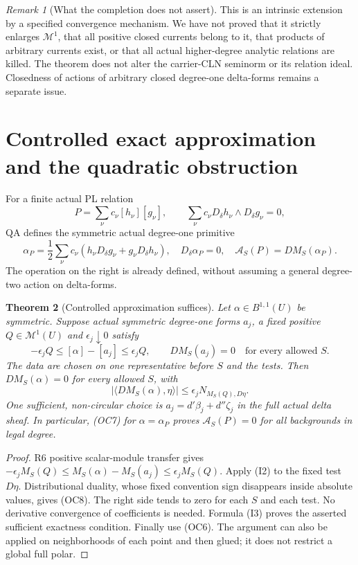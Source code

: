 \documentclass[11pt]{article}
\newtheorem{theorem}{Theorem}
\theoremstyle{remark}\newtheorem{remark}[theorem]{Remark}
\newcommand{\M}{\mathcal M^1}
\begin{document}
\begin{remark}[What the completion does not assert]
This is an intrinsic extension by a specified convergence mechanism.
We have not proved that it strictly enlarges $\M$, that all positive closed
currents belong to it, that products of arbitrary currents exist, or that
all actual higher-degree analytic relations are killed. The theorem does
not alter the carrier-CLN seminorm or its relation ideal. Closedness of
actions of arbitrary closed degree-one delta-forms remains a separate issue.
\end{remark}

\section{Controlled exact approximation and the quadratic obstruction}

For a finite actual PL relation
\[
 P=\sum_\nu c_\nu[h_\nu][g_\nu],\qquad
 \sum_\nu c_\nu D_\delta h_\nu\wedge D_\delta g_\nu=0,
\]
QA defines the symmetric actual degree-one primitive
\[
 \alpha_P=\frac12\sum_\nu c_\nu
       (h_\nu D_\delta g_\nu+g_\nu D_\delta h_\nu),
 \quad D_\delta\alpha_P=0,
 \quad\mathcal A_S(P)=DM_S(\alpha_P).                    \tag{OC6}
\]
The operation on the right is already defined, without assuming a
general degree-two action on delta-forms.

\begin{theorem}[Controlled approximation suffices]\label{thm:density}
Let $\alpha\in B^{1,1}(U)$ be symmetric. Suppose actual symmetric
degree-one forms $a_j$, a fixed positive $Q\in\M(U)$ and
$\epsilon_j\downarrow0$ satisfy
\[
 -\epsilon_jQ\le[\alpha]-[a_j]\le\epsilon_jQ,
 \qquad DM_S(a_j)=0\quad\text{for every allowed }S.      \tag{OC7}
\]
The data are chosen on one representative before $S$ and the tests.
Then $DM_S(\alpha)=0$ for every allowed $S$, with
\[
 |\langle DM_S(\alpha),\eta\rangle|
             \le \epsilon_j N_{M_S(Q),D\eta}.           \tag{OC8}
\]
One sufficient, non-circular choice is
$a_j=d'\beta_j+d''\zeta_j$ in the full actual delta sheaf.
In particular, (OC7) for $\alpha=\alpha_P$ proves
$\mathcal A_S(P)=0$ for all backgrounds in legal degree.
\end{theorem}
\begin{proof}
R6 positive scalar-module transfer gives
$-\epsilon_jM_S(Q)\le M_S(\alpha)-M_S(a_j)\le
\epsilon_jM_S(Q)$. Apply (I2) to the fixed test $D\eta$.
Distributional duality, whose fixed convention sign disappears inside
absolute values, gives (OC8). The right side tends to zero for each $S$
and each test. No derivative convergence of coefficients is needed.
Formula (I3) proves the asserted sufficient exactness condition. Finally
use (OC6). The argument can also be applied on neighborhoods of each
point and then glued; it does not restrict a global full polar.
\end{proof}
\end{document}
